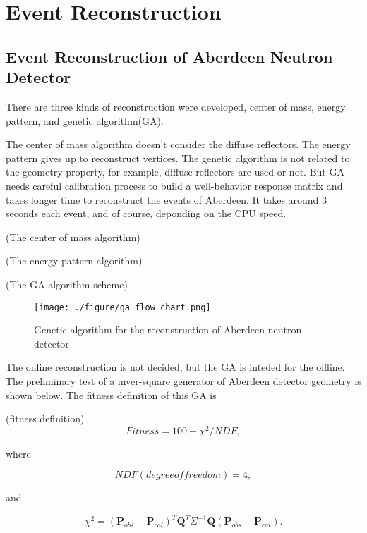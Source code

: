 \chapter {Event Reconstruction}
\section {Event Reconstruction of Aberdeen Neutron Detector}
There are three kinds of reconstruction were developed, center of mass,
energy pattern, and genetic algorithm(GA).

The center of mass algorithm doesn't consider the diffuse reflectors.
The energy pattern gives up to reconstruct vertices.
The genetic algorithm is not related to the geometry property, for example,
diffuse reflectors are used or not. But GA needs careful calibration process
to build a well-behavior response matrix and takes longer time to reconstruct
the events of Aberdeen. It takes around 3 seconds each event, and of course, deponding
on the CPU speed.


(The center of mass algorithm)




(The energy pattern algorithm)




(The GA algorithm scheme)
\begin{figure}[h]
    \centering
    \texttt{[image: ./figure/ga\_flow\_chart.png]}
    \caption{Genetic algorithm for the reconstruction of Aberdeen neutron detector}
    \label{ga_flow_chart.png}
    \end{figure}

The online reconstruction is not decided, but the GA is inteded for
the offline. The preliminary test of a inver-square generator of Aberdeen
detector geometry is shown below. The fitness definition of this GA is


(fitness definition)
\begin{equation}
\label{fitness}
Fitness = 100 - \chi^{2}/NDF,
\end{equation}


where


\begin{equation}
\label{fitnessNDF}
NDF(degree of freedom) = 4,
\end{equation}


and


\begin{equation}
\label{fitnessChi}
\chi^{2} = (\mathbf{P}_{obs} - \mathbf{P}_{cal})^T\mathbf{Q}^T\Sigma^{-1}\mathbf{Q}(\mathbf{P}_{obs} - \mathbf{P}_{cal}).
\end{equation}


